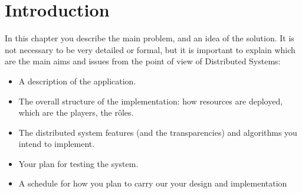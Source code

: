 \chapter{Introduction}\label{ch:intro}

In this chapter you describe the main problem, and an idea of the solution.
It is not necessary to be very detailed or formal, but it is important to explain which are the main aims and issues from the point of view of Distributed Systems:
\begin{itemize}
\item A description of the application.
\item The overall structure of the implementation: how resources are deployed, which are the players, the r\^oles.
\item The distributed system features (and the transparencies) and algorithms you intend to implement.
\item Your plan for testing the system.
\item A schedule for how you plan to carry our your design and implementation
\end{itemize}
